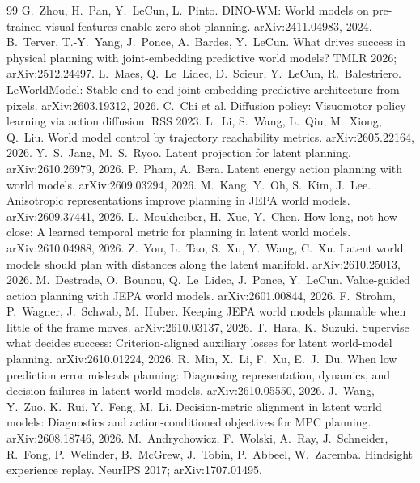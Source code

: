 \begin{thebibliography}{99}\small
{} G.~Zhou, H.~Pan, Y.~LeCun, L.~Pinto. DINO-WM: World models on pre-trained visual features enable zero-shot planning. arXiv:2411.04983, 2024.
 B.~Terver, T.-Y.~Yang, J.~Ponce, A.~Bardes, Y.~LeCun. What drives success in physical planning with joint-embedding predictive world models? TMLR 2026; arXiv:2512.24497.
 L.~Maes, Q.~Le~Lidec, D.~Scieur, Y.~LeCun, R.~Balestriero. LeWorldModel: Stable end-to-end joint-embedding predictive architecture from pixels. arXiv:2603.19312, 2026.
 C.~Chi et al. Diffusion policy: Visuomotor policy learning via action diffusion. RSS 2023.
 L.~Li, S.~Wang, L.~Qiu, M.~Xiong, Q.~Liu. World model control by trajectory reachability metrics. arXiv:2605.22164, 2026.
 Y.~S.~Jang, M.~S.~Ryoo. Latent projection for latent planning. arXiv:2610.26979, 2026.
 P.~Pham, A.~Bera. Latent energy action planning with world models. arXiv:2609.03294, 2026.
 M.~Kang, Y.~Oh, S.~Kim, J.~Lee. Anisotropic representations improve planning in JEPA world models. arXiv:2609.37441, 2026.
 L.~Moukheiber, H.~Xue, Y.~Chen. How long, not how close: A learned temporal metric for planning in latent world models. arXiv:2610.04988, 2026.
 Z.~You, L.~Tao, S.~Xu, Y.~Wang, C.~Xu. Latent world models should plan with distances along the latent manifold. arXiv:2610.25013, 2026.
 M.~Destrade, O.~Bounou, Q.~Le~Lidec, J.~Ponce, Y.~LeCun. Value-guided action planning with JEPA world models. arXiv:2601.00844, 2026.
 F.~Strohm, P.~Wagner, J.~Schwab, M.~Huber. Keeping JEPA world models plannable when little of the frame moves. arXiv:2610.03137, 2026.
 T.~Hara, K.~Suzuki. Supervise what decides success: Criterion-aligned auxiliary losses for latent world-model planning. arXiv:2610.01224, 2026.
 R.~Min, X.~Li, F.~Xu, E.~J.~Du. When low prediction error misleads planning: Diagnosing representation, dynamics, and decision failures in latent world models. arXiv:2610.05550, 2026.
 J.~Wang, Y.~Zuo, K.~Rui, Y.~Feng, M.~Li. Decision-metric alignment in latent world models: Diagnostics and action-conditioned objectives for MPC planning. arXiv:2608.18746, 2026.
 M.~Andrychowicz, F.~Wolski, A.~Ray, J.~Schneider, R.~Fong, P.~Welinder, B.~McGrew, J.~Tobin, P.~Abbeel, W.~Zaremba. Hindsight experience replay. NeurIPS 2017; arXiv:1707.01495.

\end{thebibliography}
